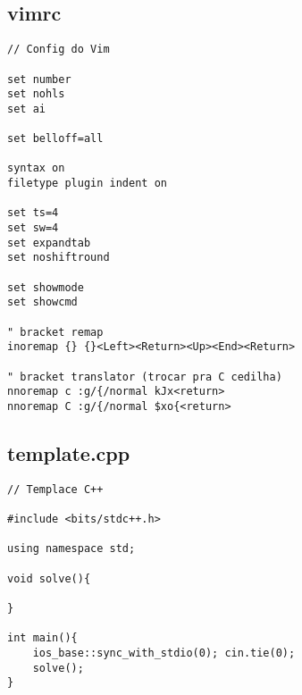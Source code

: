 \documentclass[11pt, a4paper, twoside]{article}
\begin{document}
\subsection{vimrc}
\begin{lstlisting}
// Config do Vim

set number
set nohls
set ai

set belloff=all

syntax on
filetype plugin indent on

set ts=4
set sw=4
set expandtab
set noshiftround

set showmode
set showcmd

" bracket remap
inoremap {} {}<Left><Return><Up><End><Return> 

" bracket translator (trocar pra C cedilha)
nnoremap c :g/{/normal kJx<return>
nnoremap C :g/{/normal $xo{<return>
\end{lstlisting}

\subsection{template.cpp}
\begin{lstlisting}
// Templace C++

#include <bits/stdc++.h>

using namespace std;

void solve(){

}

int main(){
	ios_base::sync_with_stdio(0); cin.tie(0);
	solve();
}
\end{lstlisting}
\end{document}
